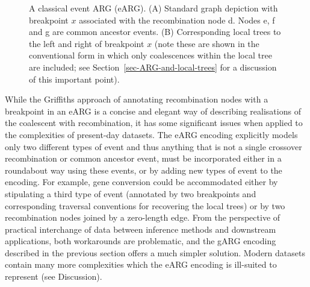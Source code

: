 \documentclass{article}
\newcommand{\noderef}[1]{\textsf{#1}}
\begin{document}
\begin{figure}
\caption{\label{fig-event-arg}
A classical event ARG (eARG). (A) Standard graph depiction with
breakpoint $x$ associated with the recombination node \noderef{d}.
Nodes \noderef{e}, \noderef{f} and \noderef{g} are common ancestor events.
(B) Corresponding local trees to the left and right of breakpoint $x$
(note these are shown in the conventional form in which only coalescences
within the local tree are included; see Section~\ref{sec-ARG-and-local-trees}
for a discussion of this important point).
}
\end{figure}

While the Griffiths approach of annotating recombination nodes with a
breakpoint in an eARG is a concise and elegant way of describing realisations
of the coalescent with recombination, it has some significant issues when applied to the
complexities of present-day datasets. The eARG encoding explicitly models only
two different types of event and thus anything that is not a single crossover
recombination or common ancestor event, must be incorporated
either in a roundabout way using these
events, or by adding new types of event to the encoding. For example, gene
conversion could be accommodated either by stipulating a third type of event
(annotated by two breakpoints and corresponding traversal conventions for
recovering the local trees) or by two recombination nodes joined by a
zero-length edge. From the perspective of practical interchange of data between
inference methods and downstream applications, both
workarounds are problematic, and the gARG encoding described in the previous
section offers a much simpler solution.
Modern datasets contain many more complexities which the eARG encoding
is ill-suited to represent (see Discussion).
\end{document}
